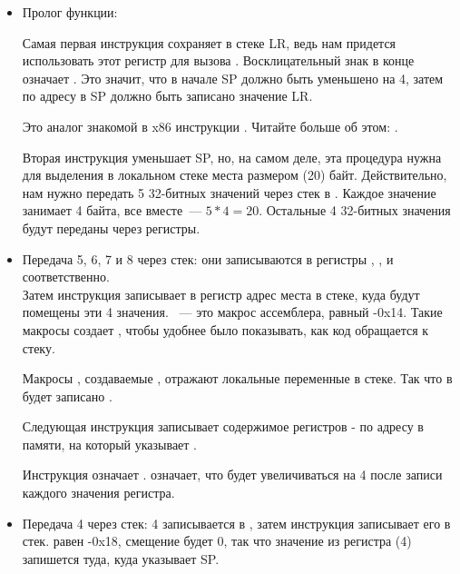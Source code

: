 \begin{itemize}
\item Пролог функции:

Самая первая инструкция  
сохраняет в стеке \ac{LR}, ведь нам придется использовать этот регистр для вызова \printf.
Восклицательный знак в конце означает .
Это значит, что в начале \ac{SP} должно быть уменьшено на 4, затем по адресу в \ac{SP} должно быть записано значение \ac{LR}.

Это аналог знакомой в x86 инструкции \PUSH. Читайте больше об этом: .

Вторая инструкция  уменьшает  \ac{SP}, но, на самом деле, эта процедура нужна для выделения в локальном стеке места размером  (20) байт.
Действительно, нам нужно передать 5 32-битных значений через стек в \printf. Каждое значение занимает 4 байта, все вместе~--- $5*4=20$.
Остальные 4 32-битных значения будут переданы через регистры.

\item Передача 5, 6, 7 и 8 через стек:
они записываются в регистры , ,  и  соответственно.\\
Затем инструкция  
записывает в регистр  адрес места в стеке, куда будут помещены эти 4 значения.
~--- это макрос ассемблера, равный -0x14.
Такие макросы создает \IDA, чтобы удобнее было показывать, как код обращается к стеку.

Макросы , создаваемые \IDA, отражают локальные переменные в стеке. Так что в  будет записано .

Следующая инструкция  записывает содержимое регистров - по адресу в памяти, на который указывает .

Инструкция  означает . 
 означает, что  будет увеличиваться на 4 после записи каждого значения регистра.

\item Передача 4 через стек:
4 записывается в , затем инструкция  записывает его в стек.
 равен -0x18, смещение будет 0, 
так что значение из регистра  (4) запишется туда, куда указывает \ac{SP}.


\end{itemize}
